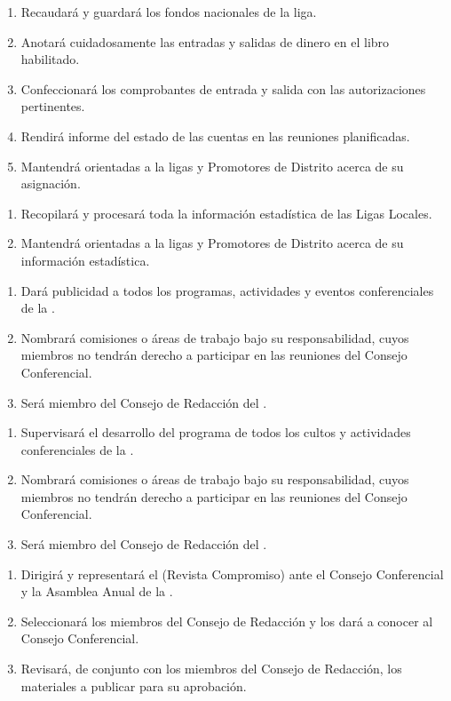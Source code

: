 \begin{enumerate}[noitemsep]
    \item Recaudará y guardará los fondos nacionales de la liga.
    \item Anotará cuidadosamente las entradas y salidas de dinero en el libro habilitado.
    \item Confeccionará los comprobantes de entrada y salida con las autorizaciones pertinentes.
    \item Rendirá informe del estado de las cuentas en las reuniones planificadas.
    \item Mantendrá orientadas a la ligas y Promotores de Distrito acerca de su asignación.
\end{enumerate}

\begin{enumerate}[noitemsep]
    \item Recopilará y procesará toda la información estadística de las Ligas Locales.
    \item Mantendrá orientadas a la ligas y Promotores de Distrito acerca de su información estadística.
\end{enumerate}

\begin{enumerate}[noitemsep]
    \item Dará publicidad a todos los programas, actividades y eventos conferenciales de la \LMJ{}.
    \item Nombrará comisiones o áreas de trabajo bajo su responsabilidad, cuyos miembros no tendrán derecho a participar en las reuniones del Consejo Conferencial.
    \item Será miembro del Consejo de Redacción del \OOLMJ{}.
\end{enumerate}

\begin{enumerate}[noitemsep]
    \item Supervisará el desarrollo del programa de todos los cultos y actividades conferenciales de la \LMJ{}.
    \item Nombrará comisiones o áreas de trabajo bajo su responsabilidad, cuyos miembros no tendrán derecho a participar en las reuniones del Consejo Conferencial.
    \item Será miembro del Consejo de Redacción del \OOLMJ{}.
\end{enumerate}

\begin{enumerate}[noitemsep]
    \item Dirigirá y representará el \OOLMJ{} (Revista Compromiso) ante el Consejo Conferencial y la Asamblea Anual de la \LMJ{}.
    \item Seleccionará los miembros del Consejo de Redacción y los dará a conocer al Consejo Conferencial.
    \item Revisará, de conjunto con los miembros del Consejo de Redacción, los materiales a publicar para su aprobación.
\end{enumerate}

